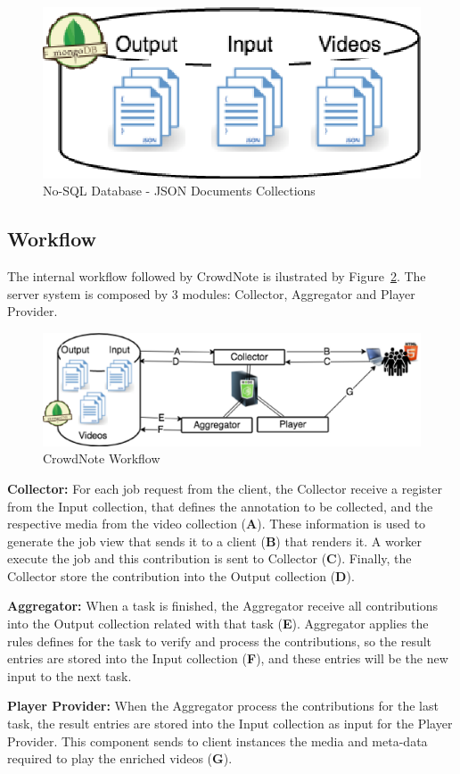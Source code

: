 \begin{figure}[h]
	\centerline{\includegraphics[scale=0.3] {figure/Persistence}}
	\caption{No-SQL Database - JSON Documents Collections}
	\label{persistence}
\end{figure}


\subsection{Workflow}

The internal workflow followed by CrowdNote is ilustrated by Figure~\ref{workflow}. The server system is composed by 3 modules: Collector, Aggregator and Player Provider.

\begin{figure}[h]
	\centerline{\includegraphics[scale=0.4] {figure/Workflow}}
	\caption{CrowdNote Workflow}
	\label{workflow}
\end{figure}

\textbf{Collector: } For each job request from the client, the Collector receive a register from the Input collection, that defines the annotation to be collected, and the respective media from the video collection (\textbf{A}). These information is used to generate the job view that sends it to a client (\textbf{B}) that renders it. A worker execute the job and this contribution is sent to Collector (\textbf{C}). Finally, the Collector store the contribution into the Output collection (\textbf{D}).

\textbf{Aggregator: } When a task is finished, the Aggregator receive all contributions into the Output collection related with that task (\textbf{E}). Aggregator applies the rules defines for the task to verify and process the contributions, so the result entries are stored into the Input collection (\textbf{F}), and these entries will be the new input to the next task.

\textbf{Player Provider: } When the Aggregator process the contributions for the last task, the result entries are stored into the Input collection as input for the Player Provider. This component sends to client instances the media and meta-data required to play the enriched videos (\textbf{G}).

